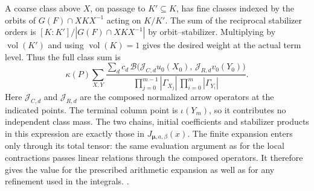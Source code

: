 A coarse class above \(X\), on passage to \(K'\subseteq K\),
has fine classes indexed by the orbits of
\(G(F)\cap X K X^{-1}\) acting on \(K/K'\).
The sum of the reciprocal stabilizer orders is
\([K:K']/|G(F)\cap X K X^{-1}|\) by orbit--stabilizer.
Multiplying by \(\operatorname{vol}(K')\) and using
\(\operatorname{vol}(K)=1\) gives the desired weight
at the actual term level. Thus the full class sum is
\[
 \kappa(P)\sum_{X,Y}
 \frac{\displaystyle\sum_d c_d\,\mathcal B
       \bigl(\mathcal J_{C,d}u_0(X_0),\,
             \mathcal J_{R,d}v_0(Y_0)\bigr)}
 {\displaystyle\prod_{j=0}^{m-1}|\Gamma_{X_j}|\,
                \prod_{i=0}^{m}|\Gamma_{Y_i}|}.
\]
Here \(\mathcal J_{C,d}\) and \(\mathcal J_{R,d}\) are the
composed normalized arrow operators at the indicated points.
The terminal column point is \(\iota(Y_m)\), so it contributes
no independent class mass. The two chains, initial coefficients
and stabilizer products in this expression are exactly those in
\(J_{\boldsymbol\mu,a,\beta}(x)\).
The finite expansion enters only through its total tensor:
the same evaluation argument as for the local contractions
passes linear relations through the composed operators. It
therefore gives the value for the prescribed arithmetic
expansion as well as for any refinement used in the integrals.
.

